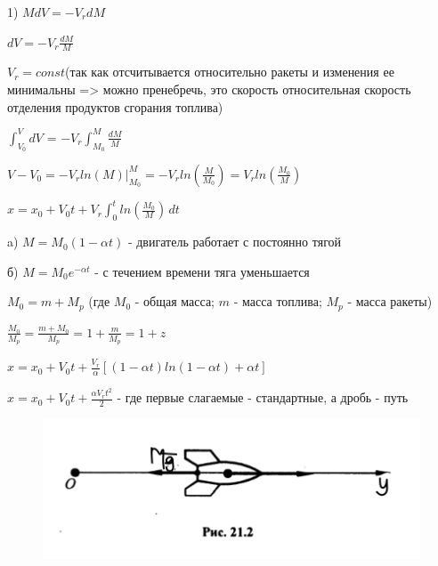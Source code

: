 {\begin{center}
    \par 1) $MdV = -V_{r} dM$
    \par $dV = -V_{r}\frac{dM}{M}$
    
    \par $V_r = const$(так как отсчитывается относительно ракеты и изменения ее минимальны => можно пренебречь, это скорость относительная скорость отделения продуктов сгорания топлива)
    
    \par \(\int_{V_0}^{V} dV\) = $-V_r$\(\int_{M_0}^{M} \frac{dM}{M}\) 
    \par $V-V_0=-V_r ln (M)\bigg|_{M_0}^{M} = -V_r ln(\frac{M}{M_0}) = V_r ln(\frac{M_0}{M})$

    \par{}  

    \par $x=x_0+V_{0}t+V_r$\(\int_{0}^{t} ln(\frac{M_0}{M}) \, dt\)

    \par a) $M=M_{0}(1-\alpha t)$ - двигатель работает с постоянно тягой

    \par б) $M=M_{0}e^{-\alpha t}$ - с течением времени тяга уменьшается 

    \par $M_0=m+M_p$ (где $M_0$ - общая масса; $m$ - масса топлива; $M_p$ - масса ракеты)

    \par $\frac{M_0}{M_p}=\frac{m+M_0}{M_p}=1+\frac{m}{M_p}=1+z$

    \par $x=x_0+V_{0}t+\frac{V_r}{\alpha}\left[ (1-\alpha t) ln(1-\alpha t) + \alpha t\right]$

    \par $x=x_0+V_{0}t+\frac{\alpha V_{r}t^{2}}{2}$ - где первые слагаемые - стандартные, а дробь - путь

    \par \begin{figure}[H]
        \centering\includegraphics[scale=0.5]{img/21.2.jpeg} 
    \end{figure}


\end{center}}
